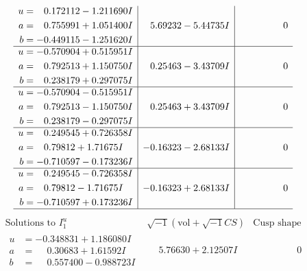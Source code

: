 \documentclass[1p]{elsarticle_modified}
\theoremstyle{definition}
\newcommand{\I}{\sqrt{-1}}
\begin{document}
$$\begin{array}{c|c|c}
\begin{aligned}
u &= \phantom{-}0.172112 - 1.211690 I \\
a &= \phantom{-}0.755991 + 1.051400 I \\
b &= -0.449115 - 1.251620 I\end{aligned}
 & \phantom{-}5.69232 - 5.44735 I & \phantom{-0.000000 } 0 \\ \hline\begin{aligned}
u &= -0.570904 + 0.515951 I \\
a &= \phantom{-}0.792513 + 1.150750 I \\
b &= \phantom{-}0.238179 + 0.297075 I\end{aligned}
 & \phantom{-}0.25463 - 3.43709 I & \phantom{-0.000000 } 0 \\ \hline\begin{aligned}
u &= -0.570904 - 0.515951 I \\
a &= \phantom{-}0.792513 - 1.150750 I \\
b &= \phantom{-}0.238179 - 0.297075 I\end{aligned}
 & \phantom{-}0.25463 + 3.43709 I & \phantom{-0.000000 } 0 \\ \hline\begin{aligned}
u &= \phantom{-}0.249545 + 0.726358 I \\
a &= \phantom{-}0.79812 + 1.71675 I \\
b &= -0.710597 - 0.173236 I\end{aligned}
 & -0.16323 - 2.68133 I & \phantom{-0.000000 } 0 \\ \hline\begin{aligned}
u &= \phantom{-}0.249545 - 0.726358 I \\
a &= \phantom{-}0.79812 - 1.71675 I \\
b &= -0.710597 + 0.173236 I\end{aligned}
 & -0.16323 + 2.68133 I & \phantom{-0.000000 } 0\\
 \hline 
 \end{array}$$\newpage$$\begin{array}{c|c|c}  
\text{Solutions to }I^u_{1}& \I (\text{vol} + \sqrt{-1}CS) & \text{Cusp shape}\\
 \hline 
\begin{aligned}
u &= -0.348831 + 1.186080 I \\
a &= \phantom{-}0.30683 + 1.61592 I \\
b &= \phantom{-}0.557400 - 0.988723 I\end{aligned}
 & \phantom{-}5.76630 + 2.12507 I & \phantom{-0.000000 } 0 \\ \hline\begin{aligned}

\end{aligned}
\end{array}$$
\end{document}

